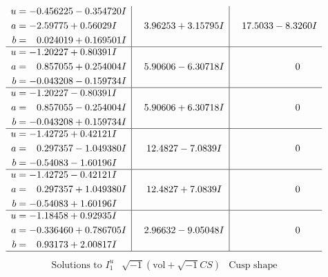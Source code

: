 \documentclass[1p]{elsarticle_modified}
\theoremstyle{definition}
\newcommand{\I}{\sqrt{-1}}
\begin{document}
$$\begin{array}{c|c|c}
\begin{aligned}
u &= -0.456225 - 0.354720 I \\
a &= -2.59775 + 0.56029 I \\
b &= \phantom{-}0.024019 + 0.169501 I\end{aligned}
 & \phantom{-}3.96253 + 3.15795 I & \phantom{-}17.5033 - 8.3260 I \\ \hline\begin{aligned}
u &= -1.20227 + 0.80391 I \\
a &= \phantom{-}0.857055 + 0.254004 I \\
b &= -0.043208 - 0.159734 I\end{aligned}
 & \phantom{-}5.90606 - 6.30718 I & \phantom{-0.000000 } 0 \\ \hline\begin{aligned}
u &= -1.20227 - 0.80391 I \\
a &= \phantom{-}0.857055 - 0.254004 I \\
b &= -0.043208 + 0.159734 I\end{aligned}
 & \phantom{-}5.90606 + 6.30718 I & \phantom{-0.000000 } 0 \\ \hline\begin{aligned}
u &= -1.42725 + 0.42121 I \\
a &= \phantom{-}0.297357 - 1.049380 I \\
b &= -0.54083 - 1.60196 I\end{aligned}
 & \phantom{-}12.4827 - 7.0839 I & \phantom{-0.000000 } 0 \\ \hline\begin{aligned}
u &= -1.42725 - 0.42121 I \\
a &= \phantom{-}0.297357 + 1.049380 I \\
b &= -0.54083 + 1.60196 I\end{aligned}
 & \phantom{-}12.4827 + 7.0839 I & \phantom{-0.000000 } 0 \\ \hline\begin{aligned}
u &= -1.18458 + 0.92935 I \\
a &= -0.336460 + 0.786705 I \\
b &= \phantom{-}0.93173 + 2.00817 I\end{aligned}
 & \phantom{-}2.96632 - 9.05048 I & \phantom{-0.000000 } 0\\
 \hline 
 \end{array}$$\newpage$$\begin{array}{c|c|c}  
\text{Solutions to }I^u_{1}& \I (\text{vol} + \sqrt{-1}CS) & \text{Cusp shape}\\
 \hline 
\begin{aligned}

\end{aligned}
\end{array}$$
\end{document}
